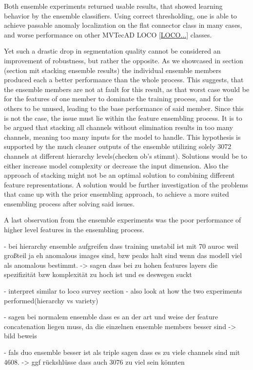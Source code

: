 Both ensemble experiments returned usable results, that showed learning behavior by the ensemble classifiers. Using correct thresholding, one is able to achieve passable anomaly localization on the flat connector class in many cases, and worse performance on other MVTecAD LOCO \ref{LOCO...} classes.

Yet such a drastic drop in segmentation quality cannot be considered an improvement of robustness, but rather the opposite. As we showcased in section (section mit stacking ensemble results) the individual ensemble members produced each a better performance than the whole process. 
This suggests, that the ensemble members are not at fault for this result, as that worst case would be for the features of one member to dominate the training process, and for the others to be unused, leading to the base performance of said member. Since this is not the case, the issue must lie within the feature ensembling process. It is to be argued that stacking all channels without elimination results in too many channels, meaning too many inputs for the model to handle. This hypothesis is supported by the much cleaner outputs of the ensemble utilizing solely 3072 channels at different hierarchy levels(checken ob's stimmt). Solutions would be to either increase model complexity or decrease the input dimension. Also the approach of stacking might not be an optimal solution to combining different feature representations. A solution would be further investigation of the problems that came up with the prior ensembling approach, to achieve a more suited ensembling process after solving said issues.
\newline

A last observation from the ensemble experiments was the poor performance of higher level features in the ensembling process. 


- bei hierarchy ensemble aufgreifen dass training unstabil ist mit 70 auroc weil großteil ja eh anomalous images sind, bzw peaks halt sind wenn das modell viel als anomalous bestimmt.
-> sagen dass bei zu hohen features layers die spezifizität bzw komplexität zu hoch ist und es deswegen suckt

- interpret similar to loco survey section\newline
- also look at how the two experiments performed(hierarchy vs variety)\newline


- sagen bei normalem ensemble dass es an der art und weise der feature concatenation liegen muss, da die einzelnen ensemble members besser sind
-> bild beweis

- fals duo ensemble besser ist als triple sagen dass es zu viele channels sind mit 4608. -> ggf rückshlüsse dass auch 3076 zu viel sein könnten

